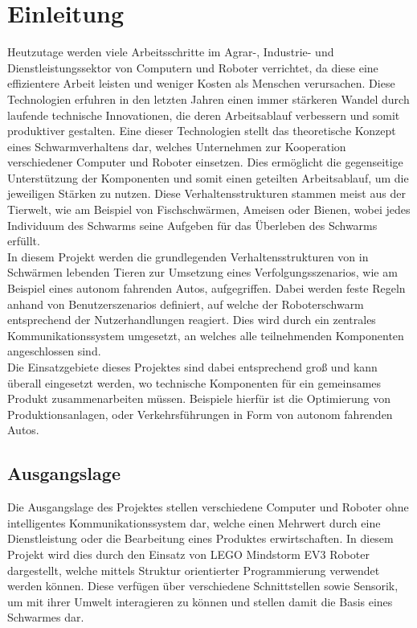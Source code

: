 \setcounter{page}{1}
\ofoot{\pagemark}

\color{finishing}
\section{Einleitung}

Heutzutage werden viele Arbeitsschritte im Agrar-, Industrie- und Dienstleistungssektor von Computern und Roboter verrichtet, da diese eine effizientere Arbeit leisten und weniger Kosten als Menschen verursachen. Diese Technologien erfuhren in den letzten Jahren einen immer stärkeren Wandel durch laufende technische Innovationen, die deren Arbeitsablauf verbessern und somit produktiver gestalten.
Eine dieser Technologien stellt das theoretische Konzept eines Schwarmverhaltens dar, welches Unternehmen zur Kooperation verschiedener Computer und Roboter einsetzen. Dies ermöglicht die gegenseitige Unterstützung der Komponenten und somit einen geteilten Arbeitsablauf, um die jeweiligen Stärken zu nutzen. Diese Verhaltensstrukturen stammen meist aus der Tierwelt, wie am Beispiel von Fischschwärmen, Ameisen oder Bienen, wobei jedes Individuum des Schwarms seine Aufgeben für das Überleben des Schwarms erfüllt.\\
In diesem Projekt werden die grundlegenden Verhaltensstrukturen von in Schwärmen lebenden Tieren zur Umsetzung eines Verfolgungsszenarios, wie am Beispiel eines autonom fahrenden Autos, aufgegriffen. Dabei werden feste Regeln anhand von Benutzerszenarios definiert, auf welche der Roboterschwarm entsprechend der Nutzerhandlungen reagiert. Dies wird durch ein zentrales Kommunikationssystem umgesetzt, an welches alle teilnehmenden Komponenten angeschlossen sind.\\
Die Einsatzgebiete dieses Projektes sind dabei entsprechend groß und kann überall eingesetzt werden, wo technische Komponenten für ein gemeinsames Produkt zusammenarbeiten müssen. Beispiele hierfür ist die Optimierung von Produktionsanlagen, oder Verkehrsführungen in Form von autonom fahrenden Autos.

\newpage
\subsection{Ausgangslage}

Die Ausgangslage des Projektes stellen verschiedene Computer und Roboter ohne intelligentes Kommunikationssystem dar, welche einen Mehrwert durch eine Dienstleistung oder die Bearbeitung eines Produktes erwirtschaften. In diesem Projekt wird dies durch den Einsatz von LEGO Mindstorm EV3 Roboter dargestellt, welche mittels Struktur orientierter Programmierung verwendet werden können. Diese verfügen über verschiedene Schnittstellen sowie Sensorik, um mit ihrer Umwelt interagieren zu können und stellen damit die Basis eines Schwarmes dar.


